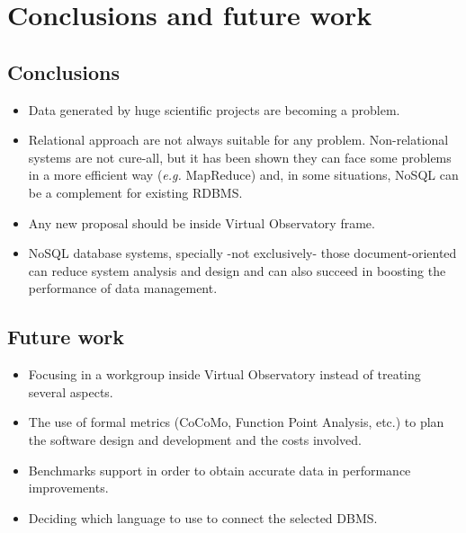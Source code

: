 \chapter{Conclusions and future work} %
\label{cha:conclusions_and_future_work}

\section{Conclusions} %
\label{sec:conclusions}

\begin{itemize}

\item Data generated by huge scientific projects are becoming a problem.

\item Relational approach are not always suitable for any problem. Non-relational systems are not cure-all, but it has been shown they can face some problems in a more efficient way (\textit{e.g.} MapReduce) and, in some situations, NoSQL can be a complement for existing RDBMS.

\item Any new proposal should be inside Virtual Observatory frame.

\item NoSQL database systems, specially -not exclusively- those document-oriented can reduce system analysis and design and can also succeed in boosting the performance of data management.

\end{itemize}


\section{Future work} %
\label{sec:future_work}

\begin{itemize}

\item Focusing in a workgroup inside Virtual Observatory instead of treating several aspects.

\item The use of formal metrics (CoCoMo, Function Point Analysis, etc.) to plan the software design and development and the costs involved.

\item Benchmarks support in order to obtain accurate data in performance improvements.

\item Deciding which language to use to connect the selected DBMS.

\end{itemize}



